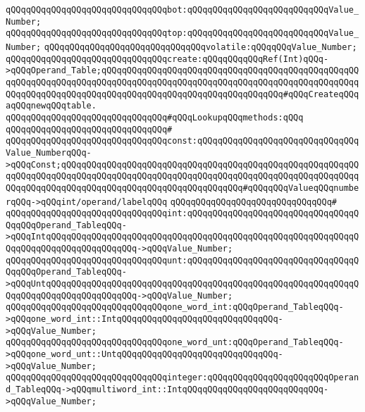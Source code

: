 \verb|qQQqqQQqqQQqqQQqqQQqqQQqqQQqqQQqbot:qQQqqQQqqQQqqQQqqQQqqQQqqQQqValue_Number;|\newline
\verb|qQQqqQQqqQQqqQQqqQQqqQQqqQQqqQQqtop:qQQqqQQqqQQqqQQqqQQqqQQqqQQqValue_Number;|\newline
\verb|qQQqqQQqqQQqqQQqqQQqqQQqqQQqqQQqvolatile:qQQqqQQqValue_Number;|\newline
\newline
\verb|qQQqqQQqqQQqqQQqqQQqqQQqqQQqqQQqcreate:qQQqqQQqqQQqRef(Int)qQQq->qQQqOperand_Table;qQQqqQQqqQQqqQQqqQQqqQQqqQQqqQQqqQQqqQQqqQQqqQQqqQQqqQQqqQQqqQQqqQQqqQQqqQQqqQQqqQQqqQQqqQQqqQQqqQQqqQQqqQQqqQQqqQQqqQQqqQQqqQQqqQQqqQQqqQQqqQQqqQQqqQQqqQQqqQQqqQQqqQQqqQQqqQQq#qQQqCreateqQQqaqQQqnewqQQqtable.|\newline
\newline
\verb|qQQqqQQqqQQqqQQqqQQqqQQqqQQqqQQq#qQQqLookupqQQqmethods:qQQq|\newline
\verb|qQQqqQQqqQQqqQQqqQQqqQQqqQQqqQQq#|\newline
\verb|qQQqqQQqqQQqqQQqqQQqqQQqqQQqqQQqconst:qQQqqQQqqQQqqQQqqQQqqQQqqQQqqQQqValue_NumberqQQq->qQQqConst;qQQqqQQqqQQqqQQqqQQqqQQqqQQqqQQqqQQqqQQqqQQqqQQqqQQqqQQqqQQqqQQqqQQqqQQqqQQqqQQqqQQqqQQqqQQqqQQqqQQqqQQqqQQqqQQqqQQqqQQqqQQqqQQqqQQqqQQqqQQqqQQqqQQqqQQqqQQqqQQqqQQqqQQqqQQqqQQq#qQQqqQQqValueqQQqnumberqQQq->qQQqint/operand/labelqQQq|\newline
\verb|qQQqqQQqqQQqqQQqqQQqqQQqqQQqqQQq#|\newline
\verb|qQQqqQQqqQQqqQQqqQQqqQQqqQQqqQQqint:qQQqqQQqqQQqqQQqqQQqqQQqqQQqqQQqqQQqqQQqOperand_TableqQQq->qQQqIntqQQqqQQqqQQqqQQqqQQqqQQqqQQqqQQqqQQqqQQqqQQqqQQqqQQqqQQqqQQqqQQqqQQqqQQqqQQqqQQqqQQqqQQq->qQQqValue_Number;|\newline
\verb|qQQqqQQqqQQqqQQqqQQqqQQqqQQqqQQqunt:qQQqqQQqqQQqqQQqqQQqqQQqqQQqqQQqqQQqqQQqOperand_TableqQQq->qQQqUntqQQqqQQqqQQqqQQqqQQqqQQqqQQqqQQqqQQqqQQqqQQqqQQqqQQqqQQqqQQqqQQqqQQqqQQqqQQqqQQqqQQqqQQq->qQQqValue_Number;|\newline
\verb|qQQqqQQqqQQqqQQqqQQqqQQqqQQqqQQqone_word_int:qQQqOperand_TableqQQq->qQQqone_word_int::IntqQQqqQQqqQQqqQQqqQQqqQQqqQQqqQQq->qQQqValue_Number;|\newline
\verb|qQQqqQQqqQQqqQQqqQQqqQQqqQQqqQQqone_word_unt:qQQqOperand_TableqQQq->qQQqone_word_unt::UntqQQqqQQqqQQqqQQqqQQqqQQqqQQqqQQq->qQQqValue_Number;|\newline
\verb|qQQqqQQqqQQqqQQqqQQqqQQqqQQqqQQqinteger:qQQqqQQqqQQqqQQqqQQqqQQqOperand_TableqQQq->qQQqmultiword_int::IntqQQqqQQqqQQqqQQqqQQqqQQqqQQq->qQQqValue_Number;|\newline
